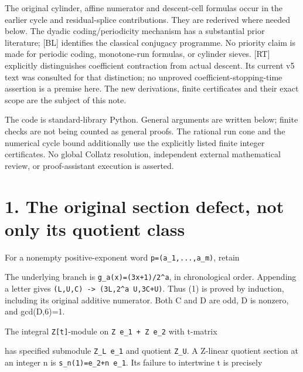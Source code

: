 The original cylinder, affine numerator and descent-cell formulas occur
in the earlier cycle and residual-splice contributions. They are
rederived where needed below. The dyadic coding/periodicity mechanism
has a substantial prior literature; {[}BL{]} identifies the classical
conjugacy programme. No priority claim is made for periodic coding,
monotone-run formulas, or cylinder sieves. {[}RT{]} explicitly
distinguishes coefficient contraction from actual descent. Its current
v5 text was consulted for that distinction; no unproved
coefficient-stopping-time assertion is a premise here. The new
derivations, finite certificates and their exact scope are the subject
of this note.

The code is standard-library Python. General arguments are written
below; finite checks are not being counted as general proofs. The
rational run cone and the numerical cycle bound additionally use the
explicitly listed finite integer certificates. No global Collatz
resolution, independent external mathematical review, or proof-assistant
execution is asserted.

\section{1. The original section defect, not only its quotient class}

For a nonempty positive-exponent word \nolinkurl{p=(a_1,...,a_m)},
retain


The underlying branch is \nolinkurl{g_a(x)=(3x+1)/2^a}, in chronological
order. Appending a letter gives \nolinkurl{(L,U,C) -> (3L,2^a U,3C+U)}.
Thus (1) is proved by induction, including its original additive
numerator. Both C and D are odd, D is nonzero, and gcd(D,6)=1.

The integral \nolinkurl{Z[t]}-module on \nolinkurl{Z e_1 + Z e_2} with
t-matrix


has specified submodule \nolinkurl{Z_L e_1} and quotient
\nolinkurl{Z_U}. A Z-linear quotient section at an integer n is
\nolinkurl{s_n(1)=e_2+n e_1}. Its failure to intertwine t is precisely

